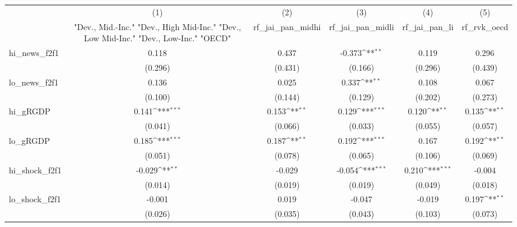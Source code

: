 {
\def\sym#1{\ifmmode^{#1}\else\(^{#1}\)\fi}
\begin{tabular}{l*{5}{c}}
\toprule
            &\multicolumn{1}{c}{(1)}&\multicolumn{1}{c}{(2)}&\multicolumn{1}{c}{(3)}&\multicolumn{1}{c}{(4)}&\multicolumn{1}{c}{(5)}\\
            &\multicolumn{1}{c}{ "Dev., Mid.-Inc." "Dev., High Mid-Inc." "Dev., Low Mid-Inc." "Dev., Low-Inc." "OECD" }&\multicolumn{1}{c}{rf\_jai\_pan\_midhi}&\multicolumn{1}{c}{rf\_jai\_pan\_midli}&\multicolumn{1}{c}{rf\_jai\_pan\_li}&\multicolumn{1}{c}{rf\_rvk\_oecd}\\
\midrule
hi\_news\_f2f1&       0.118         &       0.437         &      -0.373\sym{**} &       0.119         &       0.296         \\
            &     (0.296)         &     (0.431)         &     (0.166)         &     (0.296)         &     (0.439)         \\
\addlinespace
lo\_news\_f2f1&       0.136         &       0.025         &       0.337\sym{**} &       0.108         &       0.067         \\
            &     (0.100)         &     (0.144)         &     (0.129)         &     (0.202)         &     (0.273)         \\
\addlinespace
hi\_gRGDP    &       0.141\sym{***}&       0.153\sym{**} &       0.129\sym{***}&       0.120\sym{**} &       0.135\sym{**} \\
            &     (0.041)         &     (0.066)         &     (0.033)         &     (0.055)         &     (0.057)         \\
\addlinespace
lo\_gRGDP    &       0.185\sym{***}&       0.187\sym{**} &       0.192\sym{***}&       0.167         &       0.192\sym{**} \\
            &     (0.051)         &     (0.078)         &     (0.065)         &     (0.106)         &     (0.069)         \\
\addlinespace
hi\_shock\_f2f1&      -0.029\sym{**} &      -0.029         &      -0.054\sym{***}&       0.210\sym{***}&      -0.004         \\
            &     (0.014)         &     (0.019)         &     (0.019)         &     (0.049)         &     (0.018)         \\
\addlinespace
lo\_shock\_f2f1&      -0.001         &       0.019         &      -0.047         &      -0.019         &       0.197\sym{**} \\
            &     (0.026)         &     (0.035)         &     (0.043)         &     (0.103)         &     (0.073)         \\

\end{tabular}}
